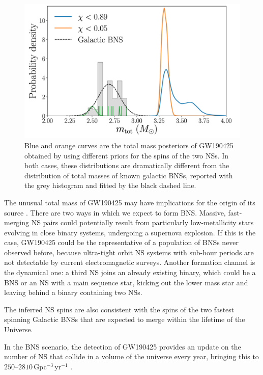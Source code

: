 \documentclass[binding=0.6cm, LaM]{sapthesis}
\begin{document}
        \begin{figure}[!t]
          \label{secondbns}
          \includegraphics[scale=0.3]{secondbns}
          \centering
          \caption{Blue and orange curves are the total mass posteriors of GW190425 obtained by using different priors for the spins of the two NSs. In both cases, these distributions are dramatically different from the distribution of total masses of known galactic BNSs, reported with the grey histogram and fitted by the black dashed line. \cite{62}}
          \label{fig:secondbns}
        \end{figure}

	The unusual total mass of GW190425 may have implications for the origin of its source \cite{28}\cite{Idem}.
	There are two ways in which we expect to form BNS. 
	Massive, fast-merging NS pairs could potentially result from 
	particularly low-metallicity stars evolving in close binary systems, undergoing a supernova explosion.
	If this is the case, GW190425 could be the representative of a population of BNSs never observed before, 
	because ultra-tight orbit NS systems with sub-hour periods are not detectable by current electromagnetic surveys.
	Another formation channel is the dynamical one: a third NS joins an already existing binary, 
	which could be a BNS or an NS with a main sequence star, kicking out the
	lower mass star and leaving behind a binary containing two NSs.

	The inferred NS spins are also consistent with the spins of the two fastest 
	spinning Galactic BNSs that are expected to merge within the lifetime of the Universe.

	In the BNS scenario, the detection of GW190425 provides an update 
	on the number of NS that collide in a volume of the universe every year, bringing this to $250$--$2810\,$Gpc$^{-3}\,$yr$^{-1}$ \cite{62}.
\end{document}
